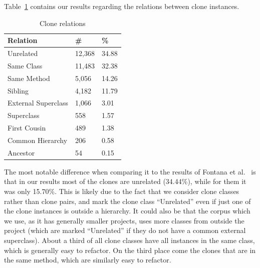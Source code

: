 \documentclass[a4paper]{article}
\begin{document}
Table~\ref{table:relations} contains our results regarding the relations between clone instances.

\begin{table}[H]
  \begin{center}
  \caption{Clone relations} \label{table:relations}
  \medskip
\begin{tabular}{|l|l|l|} \hline
\textbf{Relation} & \textbf{\#} & \textbf{\%} \\ \hline
Unrelated          & 12,368 & 34.88            \\ \hline
Same Class          & 11,483 & 32.38             \\ \hline
Same Method               & 5,056 & 14.26            \\ \hline
Sibling         & 4,182 & 11.79             \\ \hline
External Superclass   & 1,066 & 3.01             \\ \hline
Superclass          & 558 & 1.57           \\ \hline
First Cousin          & 489 & 1.38           \\ \hline
Common Hierarchy    & 206 & 0.58            \\ \hline
Ancestor          & 54 & 0.15          \\ \hline
\end{tabular}
\end{center}
\end{table}

The most notable difference when comparing it to the results of Fontana et al.~\cite{fontana2015duplicated} is that in our results most of the clones are unrelated (34.44\%), while for them it was only 15.70\%. This is likely due to the fact that we consider clone classes rather than clone pairs, and mark the clone class ``Unrelated'' even if just one of the clone instances is outside a hierarchy. It could also be that the corpus which we use, as it has generally smaller projects, uses more classes from outside the project (which are marked ``Unrelated'' if they do not have a common external superclass). About a third of all clone classes have all instances in the same class, which is generally easy to refactor. On the third place come the clones that are in the same method, which are similarly easy to refactor.
\end{document}
